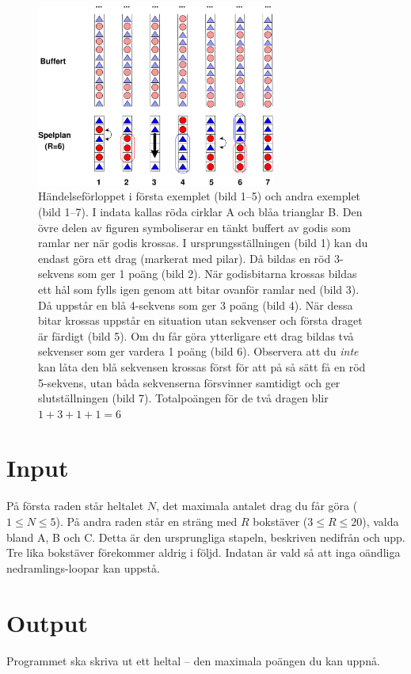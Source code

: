 \begin{figure}[ht!]
\centering
\includegraphics[width=0.7\textwidth]{godiskross_exempel.pdf}
\caption{Händelseförloppet i första exemplet (bild 1--5) och andra exemplet (bild 1--7). I indata kallas röda cirklar A och blåa trianglar B. Den övre delen av figuren symboliserar en tänkt buffert av godis som ramlar ner när godis krossas. I ursprungsställningen (bild 1) kan du endast göra ett drag (markerat med pilar). Då bildas en röd 3-sekvens som ger 1 poäng (bild 2). När godisbitarna krossas bildas ett hål som fylls igen genom att bitar ovanför ramlar ned (bild 3). 
Då uppstår en blå 4-sekvens som ger 3 poäng (bild 4). När dessa bitar krossas uppstår en situation utan sekvenser och första draget är färdigt (bild 5). Om du får göra ytterligare ett drag bildas två sekvenser som ger vardera 1 poäng (bild 6). Observera att du {\em inte} kan låta den blå sekvensen krossas först för att på så sätt få en röd 5-sekvens, utan båda sekvenserna försvinner samtidigt och ger slutställningen (bild 7). Totalpoängen för de två dragen blir $1+3+1+1=6$}
\label{overflow}
\end{figure}

\section*{Input}
På första raden står heltalet $N$, det maximala antalet drag du får göra ($1 \le N \le 5$). På andra raden står en sträng med $R$ bokstäver ($3 \le R \le 20$), valda bland A, B och C. Detta är den ursprungliga stapeln, beskriven nedifrån och upp. Tre lika bokstäver förekommer aldrig i följd. Indatan är vald så att inga oändliga nedramlings-loopar kan uppstå.

\section*{Output}
Programmet ska skriva ut ett heltal -- den maximala poängen du kan uppnå.


